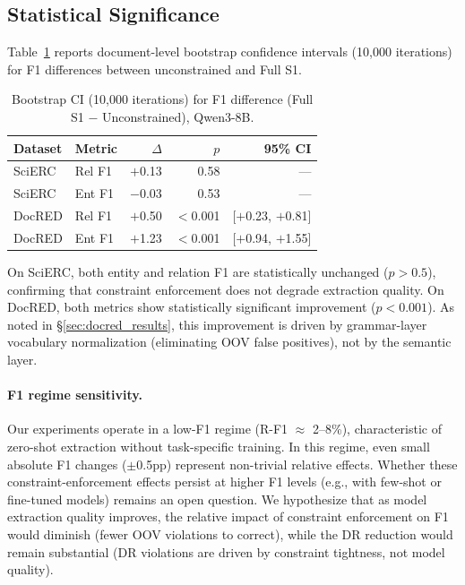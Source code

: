\documentclass[11pt,a4paper]{article}
\begin{document}
\subsection{Statistical Significance}
\label{sec:bootstrap}

Table~\ref{tab:bootstrap} reports document-level bootstrap confidence intervals (10{,}000 iterations) for F1 differences between unconstrained and Full S1.

\begin{table}[t]
\centering
\caption{Bootstrap CI (10{,}000 iterations) for F1 difference (Full S1 $-$ Unconstrained), Qwen3-8B.}
\label{tab:bootstrap}
\small
\begin{tabular}{llrrr}
\toprule
\textbf{Dataset} & \textbf{Metric} & \textbf{$\Delta$} & \textbf{$p$} & \textbf{95\% CI} \\
\midrule
SciERC  & Rel F1 & $+$0.13 & 0.58 & --- \\
SciERC  & Ent F1 & $-$0.03 & 0.53 & --- \\
DocRED  & Rel F1 & $+$0.50 & $<$0.001 & [$+$0.23, $+$0.81] \\
DocRED  & Ent F1 & $+$1.23 & $<$0.001 & [$+$0.94, $+$1.55] \\
\bottomrule
\end{tabular}
\end{table}

On SciERC, both entity and relation F1 are statistically unchanged ($p > 0.5$), confirming that constraint enforcement does not degrade extraction quality.
On DocRED, both metrics show statistically significant improvement ($p < 0.001$).
As noted in \S\ref{sec:docred_results}, this improvement is driven by grammar-layer vocabulary normalization (eliminating OOV false positives), not by the semantic layer.

\paragraph{F1 regime sensitivity.}
Our experiments operate in a low-F1 regime (R-F1 $\approx$ 2--8\%), characteristic of zero-shot extraction without task-specific training.
In this regime, even small absolute F1 changes ($\pm$0.5pp) represent non-trivial relative effects.
Whether these constraint-enforcement effects persist at higher F1 levels (e.g., with few-shot or fine-tuned models) remains an open question.
We hypothesize that as model extraction quality improves, the relative impact of constraint enforcement on F1 would diminish (fewer OOV violations to correct), while the DR reduction would remain substantial (DR violations are driven by constraint tightness, not model quality).
\end{document}
